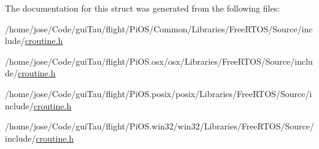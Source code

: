 The documentation for this struct was generated from the following files\-:\begin{DoxyCompactItemize}
\item 
/home/jose/\-Code/gui\-Tau/flight/\-Pi\-O\-S/\-Common/\-Libraries/\-Free\-R\-T\-O\-S/\-Source/include/\hyperlink{_common_2_libraries_2_free_r_t_o_s_2_source_2include_2croutine_8h}{croutine.\-h}\item 
/home/jose/\-Code/gui\-Tau/flight/\-Pi\-O\-S.\-osx/osx/\-Libraries/\-Free\-R\-T\-O\-S/\-Source/include/\hyperlink{osx_2osx_2_libraries_2_free_r_t_o_s_2_source_2include_2croutine_8h}{croutine.\-h}\item 
/home/jose/\-Code/gui\-Tau/flight/\-Pi\-O\-S.\-posix/posix/\-Libraries/\-Free\-R\-T\-O\-S/\-Source/include/\hyperlink{posix_2posix_2_libraries_2_free_r_t_o_s_2_source_2include_2croutine_8h}{croutine.\-h}\item 
/home/jose/\-Code/gui\-Tau/flight/\-Pi\-O\-S.\-win32/win32/\-Libraries/\-Free\-R\-T\-O\-S/\-Source/include/\hyperlink{win32_2win32_2_libraries_2_free_r_t_o_s_2_source_2include_2croutine_8h}{croutine.\-h}\end{DoxyCompactItemize}
